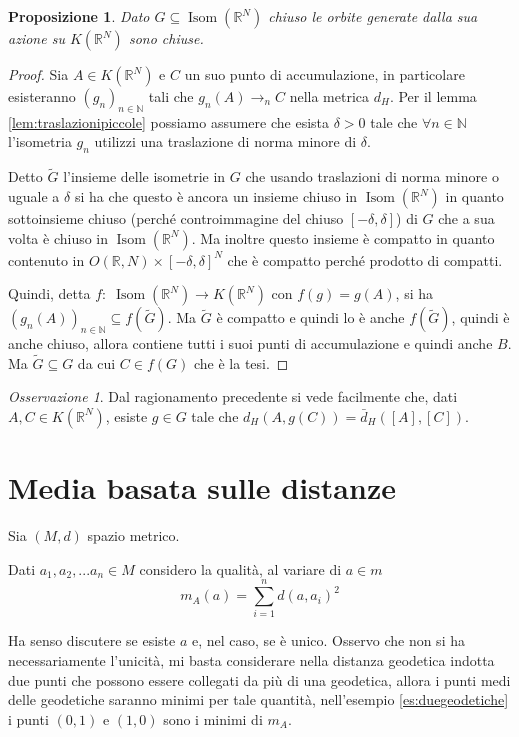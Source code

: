 \documentclass[a4paper,10pt]{article}
\newcounter{counter1}
\theoremstyle{plain}
\newtheorem{mypro}[counter1]{Proposizione}
\theoremstyle{definition}
\theoremstyle{remark}
\newtheorem{myoss}[counter1]{Osservazione}
\newcommand{\pa}[1]{\left(#1\right)}
\newcommand{\bra}[1]{\left[#1\right]}
\DeclareMathOperator{\isom}{Isom}
\begin{document}
\begin{mypro}
  Dato $G \subseteq \isom(\mathbb{R}^N)$ chiuso le orbite generate
  dalla sua azione su $K(\mathbb{R}^N)$ sono chiuse.
\end{mypro}
\begin{proof}
  Sia $A \in K(\mathbb{R}^N)$ e $C$ un suo punto di accumulazione, in
  particolare esisteranno $\pa{g_n}_{n\in \mathbb{N}}$ tali che
  $g_n(A) \to _n C$ nella metrica $d_H$. Per il lemma
  \ref{lem:traslazionipiccole} possiamo assumere che esista $\delta >
  0$ tale che $\forall n \in \mathbb{N}$ l'isometria $g_n$ utilizzi una
  traslazione di norma minore di $\delta$.

  Detto $\tilde G$ l'insieme delle isometrie in $G$ che usando
  traslazioni di norma minore o uguale a $\delta$ si ha che questo è
  ancora un insieme chiuso in $\isom\pa{\mathbb{R}^N}$ in quanto
  sottoinsieme chiuso (perché controimmagine del chiuso
  $\bra{-\delta,\delta}$) di $G$ che a sua volta è chiuso in
  $\isom(\mathbb{R}^N)$. Ma inoltre questo insieme è compatto in
  quanto contenuto in $O(\mathbb{R},N) \times \bra{-\delta,\delta}^N$
  che è compatto perché prodotto di compatti.
  
  Quindi, detta $f:\; \isom(\mathbb{R}^N) \to K(\mathbb{R}^N)$ con
  $f(g) = g(A)$, si ha $\pa{ g_n(A) }_{n \in \mathbb{N}} \subseteq
  f(\tilde G)$. Ma $\tilde G$ è compatto e quindi lo è anche $f(\tilde
  G)$, quindi è anche chiuso, allora contiene tutti i suoi punti di
  accumulazione e quindi anche $B$. Ma $\tilde G \subseteq G$ da cui
  $C \in f(G)$ che è la tesi.
\end{proof}

\begin{myoss}
  Dal ragionamento precedente si vede facilmente che, dati $A,C \in
  K(\mathbb{R}^N)$, esiste $g \in G$ tale che $d_H \pa{A, g(C)} = \bar
  d _H \pa{ \bra{A}, \bra{C}}$.
\end{myoss}

\section{Media basata sulle distanze}

Sia $(M,d)$ spazio metrico.

Dati $a_1,a_2,... a_n \in M$ considero la qualità, al variare di $a
\in m$
\[ m_A (a) = \sum _{i = 1} ^n d(a,a_i)^2 \]

Ha senso discutere se esiste $a$ e, nel caso, se è unico. Osservo che
non si ha necessariamente l'unicità, mi basta considerare nella
distanza geodetica indotta due punti che possono essere collegati da
più di una geodetica, allora i punti medi delle geodetiche saranno
minimi per tale quantità, nell'esempio \ref{es:duegeodetiche} i punti
$(0,1)$ e $(1,0)$ sono i minimi di $m_A$.
\end{document}
